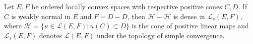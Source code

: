 Let $E, F$ be ordered locally convex spaces with respective positive cones $C, D$. If $C$ is weakly normal in $E$ and $F = D - D$, then $\mathcal{H} - \mathcal{H}$ is dense in $\mathcal{L}_s(E, F)$, where $\mathcal{H} = \{u \in \mathcal{L}(E, F): u(C) \subset D\}$ is the cone of positive linear maps and $\mathcal{L}_s(E, F)$ denotes $\mathcal{L}(E, F)$ under the topology of simple convergence.
